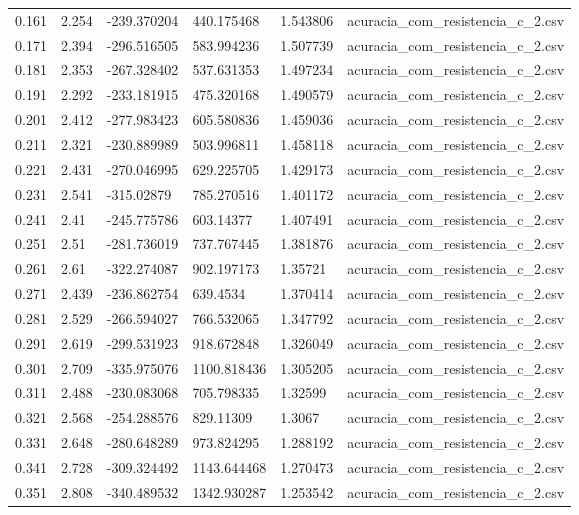 \begin{table}
\begin{tabular}{llllll}
0.161 & 2.254 & -239.370204 & 440.175468 & 1.543806 & acuracia\_com\_resistencia\_c\_2.csv \\
0.171 & 2.394 & -296.516505 & 583.994236 & 1.507739 & acuracia\_com\_resistencia\_c\_2.csv \\
0.181 & 2.353 & -267.328402 & 537.631353 & 1.497234 & acuracia\_com\_resistencia\_c\_2.csv \\
0.191 & 2.292 & -233.181915 & 475.320168 & 1.490579 & acuracia\_com\_resistencia\_c\_2.csv \\
0.201 & 2.412 & -277.983423 & 605.580836 & 1.459036 & acuracia\_com\_resistencia\_c\_2.csv \\
0.211 & 2.321 & -230.889989 & 503.996811 & 1.458118 & acuracia\_com\_resistencia\_c\_2.csv \\
0.221 & 2.431 & -270.046995 & 629.225705 & 1.429173 & acuracia\_com\_resistencia\_c\_2.csv \\
0.231 & 2.541 & -315.02879 & 785.270516 & 1.401172 & acuracia\_com\_resistencia\_c\_2.csv \\
0.241 & 2.41 & -245.775786 & 603.14377 & 1.407491 & acuracia\_com\_resistencia\_c\_2.csv \\
0.251 & 2.51 & -281.736019 & 737.767445 & 1.381876 & acuracia\_com\_resistencia\_c\_2.csv \\
0.261 & 2.61 & -322.274087 & 902.197173 & 1.35721 & acuracia\_com\_resistencia\_c\_2.csv \\
0.271 & 2.439 & -236.862754 & 639.4534 & 1.370414 & acuracia\_com\_resistencia\_c\_2.csv \\
0.281 & 2.529 & -266.594027 & 766.532065 & 1.347792 & acuracia\_com\_resistencia\_c\_2.csv \\
0.291 & 2.619 & -299.531923 & 918.672848 & 1.326049 & acuracia\_com\_resistencia\_c\_2.csv \\
0.301 & 2.709 & -335.975076 & 1100.818436 & 1.305205 & acuracia\_com\_resistencia\_c\_2.csv \\
0.311 & 2.488 & -230.083068 & 705.798335 & 1.32599 & acuracia\_com\_resistencia\_c\_2.csv \\
0.321 & 2.568 & -254.288576 & 829.11309 & 1.3067 & acuracia\_com\_resistencia\_c\_2.csv \\
0.331 & 2.648 & -280.648289 & 973.824295 & 1.288192 & acuracia\_com\_resistencia\_c\_2.csv \\
0.341 & 2.728 & -309.324492 & 1143.644468 & 1.270473 & acuracia\_com\_resistencia\_c\_2.csv \\
0.351 & 2.808 & -340.489532 & 1342.930287 & 1.253542 & acuracia\_com\_resistencia\_c\_2.csv \\

\end{tabular}
\end{table}
